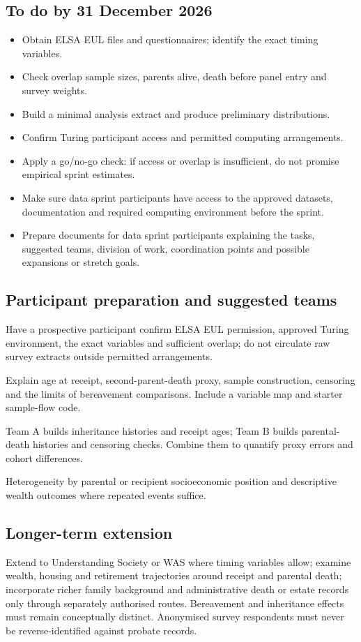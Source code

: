 \subsection{To do by 31 December 2026}
\begin{itemize}[nosep]
\item Obtain ELSA EUL files and questionnaires; identify the exact timing variables.
\item Check overlap sample sizes, parents alive, death before panel entry and survey weights.
\item Build a minimal analysis extract and produce preliminary distributions.
\item Confirm Turing participant access and permitted computing arrangements.
\item Apply a go/no-go check: if access or overlap is insufficient, do not promise empirical sprint estimates.
\item Make sure data sprint participants have access to the approved datasets, documentation and required computing environment before the sprint.
\item Prepare documents for data sprint participants explaining the tasks, suggested teams, division of work, coordination points and possible expansions or stretch goals.
\end{itemize}

\subsection{Participant preparation and suggested teams}
\begin{description}[style=nextline]
\item[Access preflight] Have a prospective participant confirm ELSA EUL permission, approved Turing environment, the exact variables and sufficient overlap; do not circulate raw survey extracts outside permitted arrangements.
\item[Participant brief] Explain age at receipt, second-parent-death proxy, sample construction, censoring and the limits of bereavement comparisons. Include a variable map and starter sample-flow code.
\item[Suggested teams] Team A builds inheritance histories and receipt ages; Team B builds parental-death histories and censoring checks. Combine them to quantify proxy errors and cohort differences.
\item[Stretch goals] Heterogeneity by parental or recipient socioeconomic position and descriptive wealth outcomes where repeated events suffice.
\end{description}

\subsection{Longer-term extension}
Extend to Understanding Society or WAS where timing variables allow; examine wealth, housing and retirement trajectories around receipt and parental death; incorporate richer family background and administrative death or estate records only through separately authorised routes. Bereavement and inheritance effects must remain conceptually distinct. Anonymised survey respondents must never be reverse-identified against probate records.
